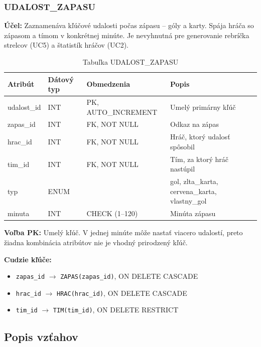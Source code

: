 \documentclass[11pt, a4paper]{article}
\begin{document}
\subsubsection{UDALOST\_ZAPASU}
\textbf{Účel:} Zaznamenáva kľúčové udalosti počas zápasu -- góly a karty. Spája hráča so zápasom a tímom v konkrétnej minúte. Je nevyhnutná pre generovanie rebríčka strelcov (UC5) a štatistík hráčov (UC2).

\begin{table}[H]
    \centering
    \caption{Tabuľka UDALOST\_ZAPASU}
    \label{tab:udalost-zapasu}
    \begin{tabular}{l l l l}
        \toprule
        \textbf{Atribút} & \textbf{Dátový typ} & \textbf{Obmedzenia} & \textbf{Popis} \\
        \midrule
        udalost\_id & INT  & PK, AUTO\_INCREMENT & Umelý primárny kľúč \\
        zapas\_id   & INT  & FK, NOT NULL        & Odkaz na zápas \\
        hrac\_id    & INT  & FK, NOT NULL        & Hráč, ktorý udalosť spôsobil \\
        tim\_id     & INT  & FK, NOT NULL        & Tím, za ktorý hráč nastúpil \\
        typ         & ENUM &                     & gol, zlta\_karta, cervena\_karta, vlastny\_gol \\
        minuta      & INT  & CHECK (1--120)      & Minúta zápasu \\
        \bottomrule
    \end{tabular}
\end{table}

\textbf{Voľba PK:} Umelý kľúč. V jednej minúte môže nastať viacero udalostí, preto žiadna kombinácia atribútov nie je vhodný prirodzený kľúč.

\textbf{Cudzie kľúče:}
\begin{itemize}
    \item \texttt{zapas\_id} $\rightarrow$ \texttt{ZAPAS(zapas\_id)}, ON DELETE CASCADE
    \item \texttt{hrac\_id} $\rightarrow$ \texttt{HRAC(hrac\_id)}, ON DELETE CASCADE
    \item \texttt{tim\_id} $\rightarrow$ \texttt{TIM(tim\_id)}, ON DELETE RESTRICT
\end{itemize}

\subsection{Popis vzťahov}
\end{document}
